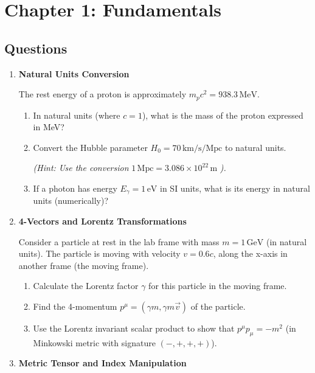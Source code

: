 \section{Chapter 1: Fundamentals}

\subsection{Questions}

\begin{enumerate}[label=1.\arabic*]
  
  \item \label{q:1.1} \textbf{Natural Units Conversion}
  
  The rest energy of a proton is approximately $m_p c^2 = 938.3 \, \text{MeV}$.
  \begin{enumerate}[label=(\alph*)]
    \item In natural units (where $c = 1$), what is the mass of the proton expressed in MeV?
    \item Convert the Hubble parameter $H_0 = 70 \, \text{km/s/Mpc}$ to natural units. 
    
    \textit{(Hint: Use the conversion } $1 \, \text{Mpc} = 3.086 \times 10^{22} \, \text{m}$ \textit{).}
    \item If a photon has energy $E_\gamma = 1 \, \text{eV}$ in SI units, what is its energy in natural units (numerically)?
  \end{enumerate}
  
  \item \label{q:1.2} \textbf{4-Vectors and Lorentz Transformations}
  
  Consider a particle at rest in the lab frame with mass $m = 1 \, \text{GeV}$ (in natural units). The particle is moving with velocity $v = 0.6c$, along the x-axis in another frame (the moving frame).
  \begin{enumerate}[label=(\alph*)]
    \item Calculate the Lorentz factor $\gamma$ for this particle in the moving frame.
    \item Find the 4-momentum $p^\mu = (\gamma m, \gamma m \vec{v})$ of the particle.
    \item Use the Lorentz invariant scalar product to show that $p^\mu p_\mu = -m^2$ (in Minkowski metric with signature $(-,+,+,+)$).
  \end{enumerate}
  
  \item \label{q:1.3} \textbf{Metric Tensor and Index Manipulation}
  

\end{enumerate}
